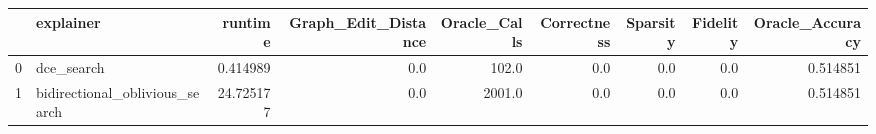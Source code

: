 \begin{tabular}{llrrrrrrr}
\toprule
{} &                       explainer &    runtime &  Graph\_Edit\_Distance &  Oracle\_Calls &  Correctness &  Sparsity &  Fidelity &  Oracle\_Accuracy \\
\midrule
0 &                      dce\_search &   0.414989 &                  0.0 &         102.0 &          0.0 &       0.0 &       0.0 &         0.514851 \\
1 &  bidirectional\_oblivious\_search &  24.725177 &                  0.0 &        2001.0 &          0.0 &       0.0 &       0.0 &         0.514851 \\
\bottomrule
\end{tabular}
